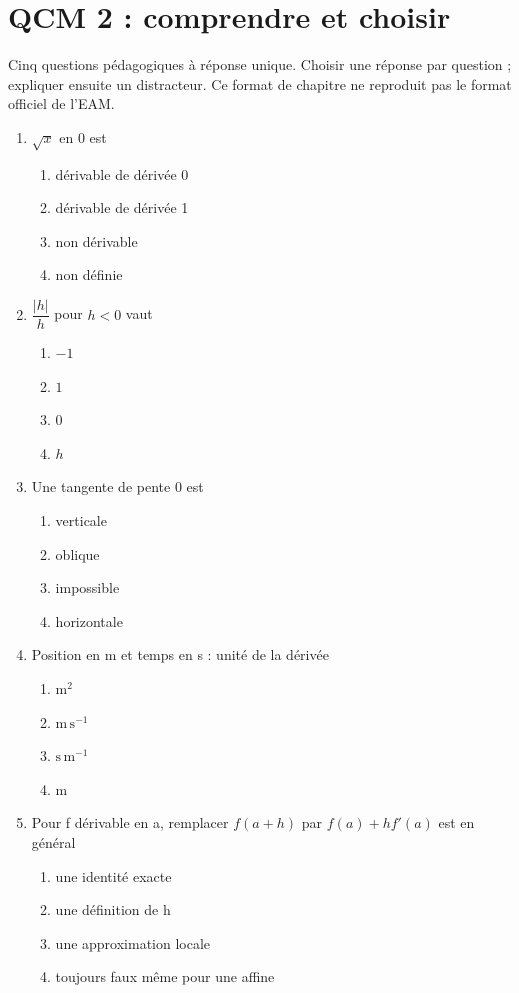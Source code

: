 \endgroup
\begingroup\small
{}\section*{QCM 2 : comprendre et choisir}\label{C04-Q2}
Cinq questions pédagogiques à réponse unique. Choisir une réponse par question ; expliquer ensuite un distracteur. Ce format de chapitre ne reproduit pas le format officiel de l’EAM.
\begin{enumerate}
\item $\sqrt{x}$ en 0 est
\begin{enumerate}[label=\Alph*.,itemsep=2pt]
\item dérivable de dérivée 0
\item dérivable de dérivée 1
\item non dérivable
\item non définie
\end{enumerate}
\item $\dfrac{|h|}{h}$ pour $h<0$ vaut
\begin{enumerate}[label=\Alph*.,itemsep=2pt]
\item $-1$
\item $1$
\item $0$
\item $h$
\end{enumerate}
\item Une tangente de pente 0 est
\begin{enumerate}[label=\Alph*.,itemsep=2pt]
\item verticale
\item oblique
\item impossible
\item horizontale
\end{enumerate}
\item Position en m et temps en s : unité de la dérivée
\begin{enumerate}[label=\Alph*.,itemsep=2pt]
\item $\mathrm{m^2}$
\item $\mathrm{m\,s^{-1}}$
\item $\mathrm{s\,m^{-1}}$
\item $\mathrm{m}$
\end{enumerate}
\item Pour f dérivable en a, remplacer $f(a+h)$ par $f(a)+hf\prime(a)$ est en général
\begin{enumerate}[label=\Alph*.,itemsep=2pt]
\item une identité exacte
\item une définition de h
\item une approximation locale
\item toujours faux même pour une affine
\end{enumerate}
\end{enumerate}
